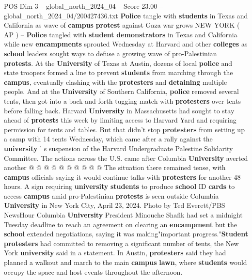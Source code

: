 \begin{textsample}{POS Dim 3 – global\_north\_2024\_04 – Score 23.00 – global\_north\_2024\_04/200427436.txt}  \label{ex:f3_pos_055}
\textbf{Police} tangle with \textbf{students} in Texas and California as wave of \textbf{campus} \textbf{protest} against Gaza war grows NEW YORK ( AP ) -- \textbf{Police} tangled with \textbf{student} \textbf{demonstrators} in Texas and California while new \textbf{encampments} sprouted Wednesday at Harvard and other \textbf{colleges} as \textbf{school} leaders sought ways to defuse a growing wave of pro-Palestinian \textbf{protests}.
At the \textbf{University} of Texas at Austin, dozens of local \textbf{police} and state troopers formed a line to prevent \textbf{students} from marching through the \textbf{campus}, eventually clashing with the \textbf{protesters} and \textbf{detaining} multiple people.
And at the \textbf{University} of Southern California, \textbf{police} removed several tents, then got into a back-and-forth tugging match with \textbf{protesters} over tents before falling back.
Harvard \textbf{University} in Massachusetts had sought to stay ahead of \textbf{protests} this week by limiting access to Harvard Yard and requiring permission for tents and tables.
But that didn't stop \textbf{protesters} from setting up a camp with 14 tents Wednesday, which came after a rally against the \textbf{university} ' s suspension of the Harvard Undergraduate Palestine Solidarity Committee.
The actions across the U.S. came after Columbia \textbf{University} averted another @ @ @ @ @ @ @ @ @ @ The situation there remained tense, with \textbf{campus} officials saying it would continue talks with \textbf{protesters} for another 48 hours.
A sign requiring \textbf{university} \textbf{students} to produce \textbf{school} ID \textbf{cards} to access \textbf{campus} amid pro-Palestinian \textbf{protests} is seen outside Columbia \textbf{University} in New York City, April 23, 2024.
Photo by Ted Everett/PBS NewsHour Columbia \textbf{University} President Minouche Shafik had set a midnight Tuesday deadline to reach an agreement on clearing an \textbf{encampment} but the \textbf{school} extended negotiations, saying it was making"important progress."\textbf{Student} \textbf{protesters} had committed to removing a significant number of tents, the New York \textbf{university} said in a statement.
In Austin, \textbf{protesters} said they had planned a walkout and march to the main \textbf{campus} \textbf{lawn}, where \textbf{students} would occupy the space and host events throughout the afternoon.

\end{textsample}

